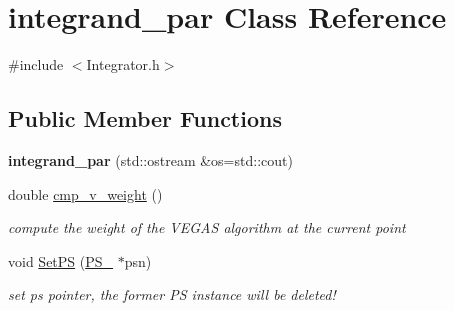 \hypertarget{classintegrand__par}{\section{integrand\-\_\-par Class Reference}
\label{classintegrand__par}
}


{\ttfamily \#include $<$Integrator.\-h$>$}

\subsection*{Public Member Functions}
\begin{DoxyCompactItemize}
\item 
\hypertarget{classintegrand__par_a91beb4d7cdba03603a3d95d46ee0621f}{{\bfseries integrand\-\_\-par} (std\-::ostream \&os=std\-::cout)}\label{classintegrand__par_a91beb4d7cdba03603a3d95d46ee0621f}

\item 
\hypertarget{classintegrand__par_aac7bdde6abcb8d81db5af3a24ce51f7d}{double \hyperlink{classintegrand__par_aac7bdde6abcb8d81db5af3a24ce51f7d}{cmp\-\_\-v\-\_\-weight} ()}\label{classintegrand__par_aac7bdde6abcb8d81db5af3a24ce51f7d}

\begin{DoxyCompactList}\small\item\em compute the weight of the V\-E\-G\-A\-S algorithm at the current point \end{DoxyCompactList}\item 
\hypertarget{classintegrand__par_a18a461b09009de0b9f8c6139994c52c4}{void \hyperlink{classintegrand__par_a18a461b09009de0b9f8c6139994c52c4}{Set\-P\-S} (\hyperlink{classPS__2}{P\-S\-\_} $\ast$psn)}\label{classintegrand__par_a18a461b09009de0b9f8c6139994c52c4}

\begin{DoxyCompactList}\small\item\em set ps pointer, the former P\-S instance will be deleted! \end{DoxyCompactList}\end{DoxyCompactItemize}
